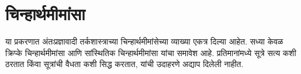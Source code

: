 \chapter{चिन्हार्थमीमांसा}\label{int:sem:chap}
\begin{editorial}
  या प्रकरणात अंतःप्रज्ञावादी तर्कशास्त्राच्या
  चिन्हार्थमीमांसेच्या व्याख्या एकत्र दिल्या
  आहेत. सध्या केवळ क्रिप्के चिन्हार्थमीमांसा आणि
  सांस्थितिक चिन्हार्थमीमांसा यांचा समावेश आहे.
  प्रतिमानांमध्ये सूत्रे सत्य कशी ठरतात किंवा
  सूत्रांची वैधता कशी सिद्ध करतात, यांची उदाहरणे
  अद्याप दिलेली नाहीत.
\end{editorial}
